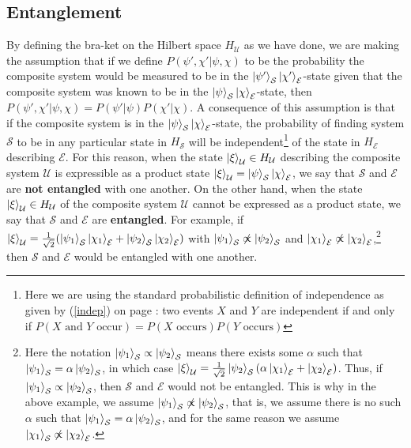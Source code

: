     \subsection{Entanglement}  
     By defining the bra-ket on the Hilbert space $H_\mathcal{U}$ as we have done, we are making the assumption that if we define $P(\psi',\chi'|\psi,\chi)$ to be the probability the composite system would be measured to be in the $\ket{\psi'}_\mathcal{S}\ket{\chi'}_\mathcal{E}$-state given that the composite system was known to be in the $\ket{\psi}_\mathcal{S}\ket{\chi}_\mathcal{E}$-state, then $P(\psi',\chi'|\psi,\chi)=P(\psi'|\psi)P(\chi'|\chi).$ A consequence of this assumption is that if the composite system is in the $\ket{\psi}_\mathcal{S}\ket{\chi}_\mathcal{E}$-state, the probability of finding system $\mathcal{S}$ to be in any particular state in $H_\mathcal{S}$ will be independent\footnote{Here we are using the standard probabilistic definition of independence as given by (\ref{indep}) on page \pageref{indep}: two events $X$ and $Y$ are independent if and only if $P(X \text{ and } Y\text{ occur})=P(X\text{ occurs})P(Y\text{ occurs})$} of the state in $H_\mathcal{E}$ describing $\mathcal{E}$. For this reason, when the state $\ket{\xi}_\mathcal{U}\in H_\mathcal{U}$ describing the composite system $\mathcal{U}$ is expressible as a product state $\ket{\xi}_\mathcal{U}=\ket{\psi}_\mathcal{S}\ket{\chi}_\mathcal{E}$,  we say that $\mathcal{S}$ and $\mathcal{E}$ are \textbf{not entangled} with one another. On the other hand, when  the state $\ket{\xi}_\mathcal{U}\in H_\mathcal{U}$ of the composite system $\mathcal{U}$ cannot be expressed as a product state, we say that $\mathcal{S}$ and $\mathcal{E}$ are \textbf{entangled}.
       For example, if $\ket{\xi}_\mathcal{U}=\frac{1}{\sqrt{2}}(\ket{\psi_1}_\mathcal{S}\ket{\chi_1}_\mathcal{E}+\ket{\psi_2}_\mathcal{S}\ket{\chi_2}_\mathcal{E})$ with $\ket{\psi_1}_\mathcal{S}\not\propto\ket{\psi_2}_\mathcal{S}$ and $\ket{\chi_1}_\mathcal{E}\not\propto\ket{\chi_2}_\mathcal{E}$,\footnote{Here the notation $\ket{\psi_1}_\mathcal{S}\propto\ket{\psi_2}_\mathcal{S}$ means there exists some $\alpha$ such that $\ket{\psi_1}_\mathcal{S}=\alpha\ket{\psi_2}_\mathcal{S}$, in which case $\ket{\xi}_\mathcal{U}=\frac{1}{\sqrt{2}}\ket{\psi_2}_\mathcal{S}(\alpha\ket{\chi_1}_\mathcal{E}+\ket{\chi_2}_\mathcal{E})$. Thus, if  $\ket{\psi_1}_\mathcal{S}\propto\ket{\psi_2}_\mathcal{S}$, then  $\mathcal{S}$ and $\mathcal{E}$   %
%
       would not be entangled. This is why in the above example, we assume $\ket{\psi_1}_\mathcal{S}\not\propto\ket{\psi_2}_\mathcal{S}$, that is, we assume there is no such $\alpha$ such that $\ket{\psi_1}_\mathcal{S}=\alpha\ket{\psi_2}_\mathcal{S}$, and for the same reason we assume $\ket{\chi_1}_\mathcal{S}\not\propto\ket{\chi_2}_\mathcal{E}$.} then $\mathcal{S}$ and $\mathcal{E}$ would be entangled with one another.
      
